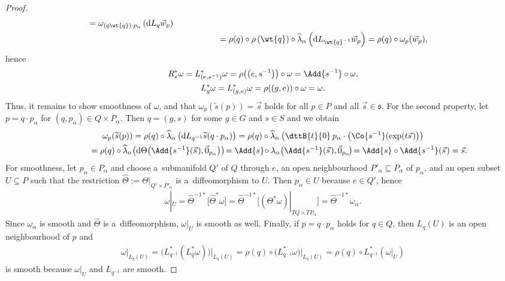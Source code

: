 \documentclass[pdftex]{sigma}
\numberwithin{equation}{section}
\begin{document}
\begin{proof}
\begin{gather*}
\begin{split}
=\omega_{(q\wt{q})\cdot p_\alpha}\left(\mathrm{d} L_q \vec{w}_{p}\right)
\\
&\phantom{\left(L_q^{*}\omega\right)_{p}(\vec{w}_{p})}
=\rho(q)\circ\rho\left(\wt{q}\right)\circ \widehat{\lambda}_\alpha\left(\mathrm{d}
L_{\wt{q}^{-1}}\vec{w}_{p}\right) =\rho(q)\circ \omega_{p}(\vec{w}_{p}),
\end{split}
\end{gather*}
hence
\begin{gather*}
R_s^{*}\omega\phantom{}=L_{\left(e,s^{-1}\right)}^{*}\omega=\rho\big(\big(e,s^{-1}\big)\big)\circ \omega
=\Add{s^{-1}}\circ \omega,
\\
L_g^{*}\omega =L_{(g,e)}^{*}\omega=\rho((g,e))\circ \omega=\omega.
\end{gather*}
Thus, it remains to show smoothness of $\omega$, and that $\omega_p(\widetilde{s}(p))=\vec{s}$ holds for all $p\in P$ and
all $\vec{s}\in \mathfrak{s}$.
For the second property, let $p=q\cdot p_\alpha$ for $(q,p_\alpha)\in Q\times P_\alpha$.
Then $q=(g,s)$ for some $g\in G$ and $s\in S$ and we obtain
\begin{gather*}
\omega_{p}(\widetilde{s}(p))=\rho(q)\circ \widehat{\lambda}_\alpha\left(\mathrm{d} L_{q^{-1}}\widetilde{s}(q\cdot
p_\alpha)\right)
=\rho(q)\circ \widehat{\lambda}_\alpha\left(\dttB{t}{0}\hspace{2pt} p_\alpha\cdot
\left(\Co{s^{-1}}(\exp(t\vec{s}\hspace{1pt})\right)\right)
\\
\phantom{\omega_{p}(\widetilde{s}(p))}
=\rho(q)\circ\widehat{\lambda}_\alpha
\big(\mathrm{d}\Theta\big(\Add{s^{-1}}(\vec{s}\hspace{1pt}),\vec{0}_{p_\alpha}\big)\big)\!
=\Add{s}\!\circ \lambda_\alpha\big(\Add{s^{-1}}(\vec{s}\hspace{1pt}),\vec{0}_{p_\alpha}\!\big)\!
=\Add{s}\circ\Add{s^{-1}}(\vec{s}\hspace{1pt})=\vec{s}.
\end{gather*}
For smoothness, let $p_\alpha\in P_\alpha$ and choose a~submanifold $Q'$ of $Q$ through $e$, an open neighbourhood
$P'_\alpha\subseteq P_\alpha$ of $p_\alpha$, and an open subset $U\subseteq P$ such that the restriction
$\widehat{\Theta}:=\Theta|_{Q' \times P'_\alpha}$ is a~dif\/feomorphism to $U$.
Then $p_\alpha \in U$ because $e\in Q'$, hence
\begin{gather*}
\omega|_U=\widehat{\Theta}^{-1*} \big[\widehat{\Theta}^{*}\omega\big]
=\widehat{\Theta}^{-1*} \big[(\Theta^{*}\omega)|_{TQ\times
TP_\alpha}\big] =\widehat{\Theta}^{-1*} \omega_\alpha.
\end{gather*}
Since $\omega_\alpha$ is smooth and $\widehat{\Theta}$ is a~dif\/feomorphism, $\omega|_U$ is smooth as well.
Finally, if $p=q\cdot p_\alpha$ holds for $q\in Q$, then $L_q(U)$ is an open neighbourhood of $p$ and
\begin{gather*}
\omega|_{L_q(U)}=\big(L_{q^{-1}}^{*}\left(L_q^{*}\omega\right)\big)\big|_{L_q(U)}= \rho(q)\circ
\big(L_{q^{-1}}^{*}\omega\big)\big|_{L_q(U)} =\rho(q)\circ L_{q^{-1}}^{*} \left(\omega|_U\right)
\end{gather*}
is smooth because $\omega|_U$ and $L_{q^{-1}}$ are smooth.
\end{proof}
\end{document}
